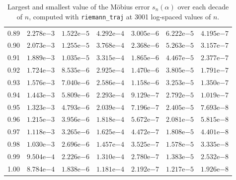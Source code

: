 \begin{table}[htb!]
\begin{tabular}{|c|cc|cc|cc|}
0.89 & $2.278\mathrm{e}{-3}$ & $1.522\mathrm{e}{-5}$ & $4.292\mathrm{e}{-4}$ & $3.005\mathrm{e}{-6}$ & $6.222\mathrm{e}{-5}$ & $4.195\mathrm{e}{-7}$ \\
0.90 & $2.073\mathrm{e}{-3}$ & $1.255\mathrm{e}{-5}$ & $3.768\mathrm{e}{-4}$ & $2.368\mathrm{e}{-6}$ & $5.263\mathrm{e}{-5}$ & $3.157\mathrm{e}{-7}$ \\
0.91 & $1.889\mathrm{e}{-3}$ & $1.035\mathrm{e}{-5}$ & $3.315\mathrm{e}{-4}$ & $1.865\mathrm{e}{-6}$ & $4.467\mathrm{e}{-5}$ & $2.377\mathrm{e}{-7}$ \\
0.92 & $1.724\mathrm{e}{-3}$ & $8.535\mathrm{e}{-6}$ & $2.925\mathrm{e}{-4}$ & $1.470\mathrm{e}{-6}$ & $3.805\mathrm{e}{-5}$ & $1.791\mathrm{e}{-7}$ \\
0.93 & $1.576\mathrm{e}{-3}$ & $7.040\mathrm{e}{-6}$ & $2.586\mathrm{e}{-4}$ & $1.158\mathrm{e}{-6}$ & $3.253\mathrm{e}{-5}$ & $1.350\mathrm{e}{-7}$ \\
0.94 & $1.443\mathrm{e}{-3}$ & $5.809\mathrm{e}{-6}$ & $2.293\mathrm{e}{-4}$ & $9.129\mathrm{e}{-7}$ & $2.792\mathrm{e}{-5}$ & $1.019\mathrm{e}{-7}$ \\
0.95 & $1.323\mathrm{e}{-3}$ & $4.793\mathrm{e}{-6}$ & $2.039\mathrm{e}{-4}$ & $7.196\mathrm{e}{-7}$ & $2.405\mathrm{e}{-5}$ & $7.693\mathrm{e}{-8}$ \\
0.96 & $1.215\mathrm{e}{-3}$ & $3.956\mathrm{e}{-6}$ & $1.818\mathrm{e}{-4}$ & $5.672\mathrm{e}{-7}$ & $2.081\mathrm{e}{-5}$ & $5.815\mathrm{e}{-8}$ \\
0.97 & $1.118\mathrm{e}{-3}$ & $3.265\mathrm{e}{-6}$ & $1.625\mathrm{e}{-4}$ & $4.472\mathrm{e}{-7}$ & $1.808\mathrm{e}{-5}$ & $4.401\mathrm{e}{-8}$ \\
0.98 & $1.030\mathrm{e}{-3}$ & $2.696\mathrm{e}{-6}$ & $1.457\mathrm{e}{-4}$ & $3.525\mathrm{e}{-7}$ & $1.578\mathrm{e}{-5}$ & $3.335\mathrm{e}{-8}$ \\
0.99 & $9.504\mathrm{e}{-4}$ & $2.226\mathrm{e}{-6}$ & $1.310\mathrm{e}{-4}$ & $2.780\mathrm{e}{-7}$ & $1.383\mathrm{e}{-5}$ & $2.532\mathrm{e}{-8}$ \\
1.00 & $8.784\mathrm{e}{-4}$ & $1.838\mathrm{e}{-6}$ & $1.181\mathrm{e}{-4}$ & $2.192\mathrm{e}{-7}$ & $1.217\mathrm{e}{-5}$ & $1.926\mathrm{e}{-8}$ \\
\hline
\end{tabular}
\caption{Largest and smallest value of the M\"obius error $s_n(\alpha)$ over each decade of $n$, computed with \texttt{riemann\_traj} at 3001 log-spaced values of $n$.}
\label{tab:envelope}
\end{table}

